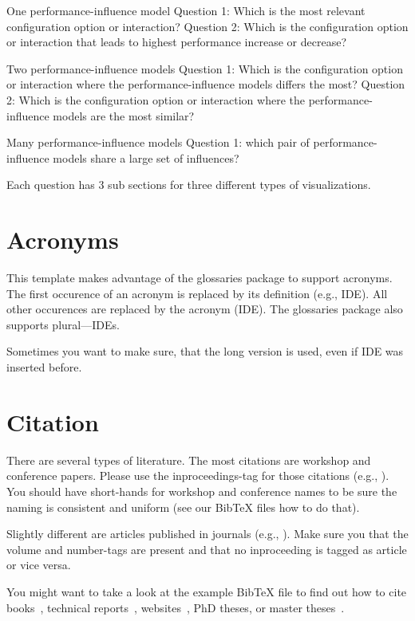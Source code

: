 One performance-influence model
  Question 1: Which is the most relevant configuration option or interaction?
  Question 2: Which is the configuration option or interaction that leads to highest performance increase or decrease?

Two performance-influence models
 Question 1: Which is the configuration option or interaction where the performance-influence models differs the most?
 Question 2: Which is the configuration option or interaction where the performance-influence models are the most similar?

Many performance-influence models
 Question 1: which pair of performance-influence models share a large set of influences?

 Each question has 3 sub sections for three different types of visualizations.

\section{Acronyms}

This template makes advantage of the glossaries package to support acronyms. The first occurence of an acronym is replaced by its definition (e.g., \gls{IDE}). All other occurences are replaced by the acronym (\gls{IDE}). The glossaries package also supports plural---\glspl{IDE}.

Sometimes you want to make sure, that the long version is used, even if \gls{IDE} was inserted before.
 
\section{Citation}

There are several types of literature. The most citations are workshop and conference papers. Please use the inproceedings-tag for those citations (e.g., \cite{KAK:GPCE09}). You should have short-hands for workshop and conference names to be sure the naming is consistent and uniform (see our BibTeX files how to do that).
 
Slightly different are articles published in journals (e.g., \cite{KG:SME06}). Make sure you that the volume and number-tags are present and that no inproceeding is tagged as article or vice versa.

You might want to take a look at the example BibTeX file to find out how to cite books~\cite{CE:BOOK00}, technical reports~\cite{KCHNP:TR90}, websites~\cite{Coq:website}, PhD theses, or master theses~\cite{B:PHD03,R:MT09}.

